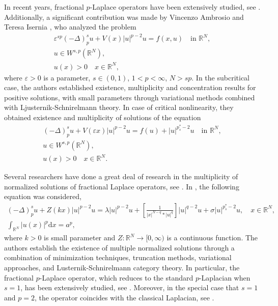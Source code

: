 \documentclass[reqno]{amsart}
\begin{document}
In recent years, fractional $p$-Laplace operators have been extensively studied,
see \cite{ref3, ref4, ref18, ref26, ref32}. Additionally, a significant contribution was
made by Vincenzo Ambrosio and Teresa Isernia  \cite{ref1}, who analyzed the problem
\begin{gather*}
\varepsilon^{sp}(-\Delta)_p^{s} u+V(x)|u|^{p-2}u=f(x,u)\quad\text{in }\mathbb{R}^N,\\
u\in W^{s,p}(\mathbb{R}^N),\\
u(x)>0\quad  x\in\mathbb{R}^N,
\end{gather*}
where $\varepsilon>0$ is a parameter, $s\in(0,1)$, $1<p<\infty$, $N>sp$.
In the subcritical case, the authors established existence, multiplicity and concentration
results for positive solutions, with small parameters through variational methods combined with Ljusternik-Schnirelmann theory.
In case of  critical nonlinearity, they obtained existence and multiplicity of solutions of the equation
\begin{gather*}
(-\Delta)_p^{s} u+V(\varepsilon x)|u|^{p-2}u=f(u)+|u|^{p_{s}^{*}-2}u\quad\text{in }\mathbb{R}^N,\\
u\in W^{s,p}(\mathbb{R}^N),\\
u(x)>0\quad x\in\mathbb{R}^N.
\end{gather*}

Several researchers have done a great deal of research in the multiplicity of
normalized solutions of fractional Laplace operators, see \cite{ref23, ref27, ref35}.
In \cite{ref36}, the following equation was considered,
\begin{gather*}
(-\Delta)_p^{s} u+Z(kx)|u|^{p-2}u=\lambda|u|^{p-2}u+[\frac{1}{|x|^{N-q}*|u|^{q}}]|u|^{q-2}u
+\sigma|u|^{p_s^{*}-2}u,\quad x\in \mathbb{R}^{N},\\
\int_{\mathbb{R}^{N}}|u(x)|^{p}\mathrm{d}x=a^{p},
\end{gather*}
where $k>0$ is small parameter and $Z:\mathbb{R}^N\to[0,\infty)$ is a continuous function.
The authors establish the existence of multiple normalized solutions through a combination
of minimization techniques, truncation methods, variational approaches,
and Lusternik-Schnirelmann category theory. In particular, the fractional $p$-Laplace
operator, which reduces to the standard $p$-Laplacian when $s = 1$, has been extensively
studied, see \cite{ref6, ref15, ref21, n2}.
Moreover, in the special case that $s = 1$ and $p = 2$, the operator coincides with the classical Laplacian, see \cite{ref12, ref28, ref29}.
\end{document}
